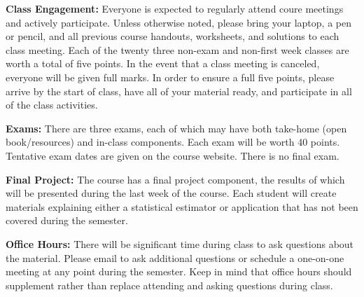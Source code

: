 \documentclass[11pt, a4paper]{article}
\begin{document}
\textbf{Class Engagement:}
Everyone is expected to regularly attend coure meetings and actively
participate. Unless otherwise noted, please bring your laptop, a pen
or pencil, and all previous course handouts, worksheets, and solutions
to each class meeting. 
Each of the twenty three non-exam and non-first week classes are worth
a total of five points. In the event that a class meeting is canceled,
everyone will be given full marks. In order to ensure a full five points,
please arrive by the start of class, have all of your material ready, and
participate in all of the class activities.

\bigskip

\textbf{Exams:}
There are three exams, each of which may have both take-home
(open book/resources) and in-class components. Each exam will be
worth 40 points. Tentative exam dates are given on the course
website. There is no final exam.

\bigskip

\textbf{Final Project:}
The course has a final project component, the results of which will
be presented during the last week of the course. Each student will
create materials explaining either a statistical estimator or application
that has not been covered during the semester. 

\bigskip

\textbf{Office Hours:}
There will be significant time during class to ask questions about
the material. Please email to ask additional questions or schedule a
one-on-one meeting at any point during the semester. Keep in
mind that office hours should supplement rather than replace
attending and asking questions during class.
\end{document}

